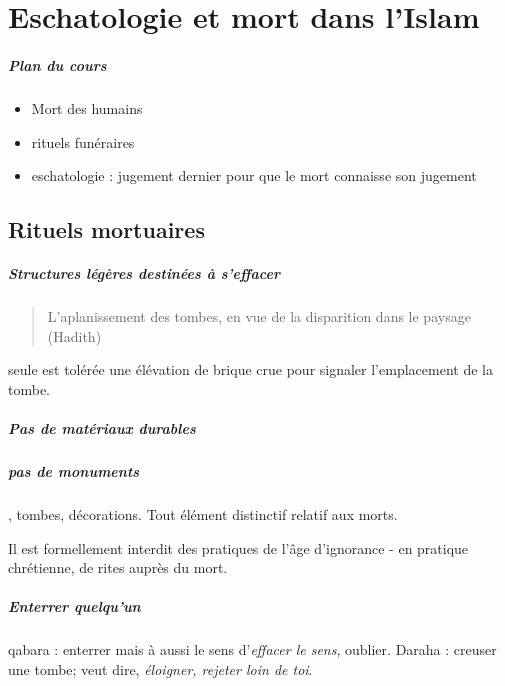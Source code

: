\chapter{Eschatologie et mort dans l'Islam}


\paragraph{Plan du cours}
\begin{itemize}
    \item Mort des humains
    \item rituels funéraires
    \item eschatologie : jugement dernier pour que le mort connaisse son jugement
\end{itemize}


\section{Rituels mortuaires}

\paragraph{Structures légères destinées à s'effacer}

\begin{quote}
    L'aplanissement des tombes, en vue de la disparition dans le paysage (Hadith)
\end{quote}
seule est tolérée une élévation de brique crue pour signaler l'emplacement de la tombe.

\paragraph{Pas de matériaux durables}

\paragraph{pas de monuments}, tombes, décorations. Tout élément distinctif relatif aux morts. 

Il est formellement interdit des pratiques de l'âge d'ignorance - en pratique chrétienne, de rites auprès du mort.

\paragraph{Enterrer quelqu'un} qabara  : enterrer mais à aussi le sens d'\textit{effacer le sens}, oublier. 
Daraha : creuser une tombe; veut dire, \textit{éloigner, rejeter loin de toi}. 

